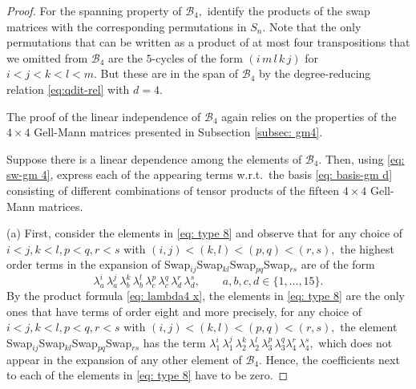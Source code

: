 \documentclass[12pt,dvipsnames,accepted=2016-08-18,a4paper,onecolumn]{quantumarticle}
\numberwithin{equation}{section}
\theoremstyle{definition}
\begin{document}
\begin{proof}
	For the spanning property of $\mathcal{B}_4,$ identify the products of the swap matrices with the corresponding permutations in $S_n.$ Note that the only permutations that can be written as a product of at most four transpositions that we omitted from $\mathcal{B}_4$ are the $5$-cycles of the form $(i\,m\,l\,k\,j)$ for $i<j<k<l<m.$ But these are in the span of $\mathcal{B}_4$ by the degree-reducing relation \eqref{eq:qdit-rel} with $d=4.$
	
	
	The proof of the linear independence of $\mathcal{B}_4$ again relies on the properties of the $4\times 4$ Gell-Mann matrices presented in Subsection \ref{subsec: gm4}.
	
	Suppose there is a linear dependence among the elements of $\mathcal{B}_4.$ 
	Then, using \eqref{eq: sw-gm 4}, express each of the appearing terms w.r.t.~the basis \eqref{eq: basis-gm d} consisting of different combinations of tensor products of the fifteen $4 \times 4$ Gell-Mann matrices.
	
	(a) First, consider the elements in \eqref{eq: type 8} and observe that for any choice of $i < j, k < l,  p < q, r < s$ with  $(i,j) < (k,l) < (p,q)<(r,s),$ the highest order terms in the expansion of Swap$_{ij}$Swap$_{kl}$Swap$_{pq}$Swap$_{rs}$ are of the form
	$$
	\lambda_a^i\, \lambda_a^j\, \lambda_b^k\, \lambda_b^l\, \lambda_c^p\, \lambda_c^q \, \lambda_d^r\, \lambda_d^s, \quad \quad a,b,c,d \in \{1,\ldots,15\}.
	$$
	By the product formula \eqref{eq: lambda4 x}, the elements in \eqref{eq: type 8} are the only ones that have terms of order eight and more precisely, for any choice of $i < j, k < l,  p < q, r < s$ with  $(i,j) < (k,l) < (p,q)<(r,s),$ the element Swap$_{ij}$Swap$_{kl}$Swap$_{pq}$Swap$_{rs}$  has the term $\lambda_1^i\, \lambda_1^j\, \lambda_2^k\, \lambda_2^l\, \lambda_3^p\, \lambda_3^q\lambda_4^r\, \lambda_4^s,$
	which does not appear in the expansion of any other element of $\mathcal{B}_4.$ Hence, the coefficients next to each of the elements in \eqref{eq: type 8} have to be zero. 
	

\end{proof}
\end{document}
